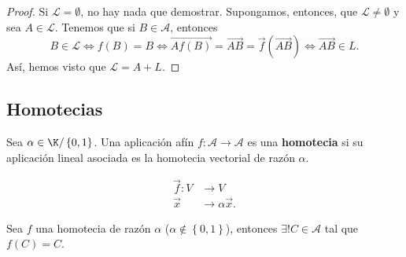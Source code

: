 \begin{proof}
Si $\displaystyle \mathcal{L} = \emptyset $, no hay nada que demostrar. Supongamos, entonces, que $\displaystyle \mathcal{L} \neq \emptyset $ y sea $\displaystyle A \in \mathcal{L} $. Tenemos que si $\displaystyle B \in \mathcal{A} $, entonces 
\[ B \in \mathcal{L} \iff f\left(B\right) = B \iff \overrightarrow{Af\left(B\right)} =\overrightarrow{AB} =\vec{f}\left(\overrightarrow{AB} \right)\iff \overrightarrow{AB} \in L.\]
Así, hemos visto que $\displaystyle \mathcal{L} = A + L $.
\end{proof}
\subsection{Homotecias}
\begin{fdefinition}[Homotecia]
	\normalfont Sea $\displaystyle \alpha \in \K / \left\{ 0,1\right\}  $. Una aplicación afín $\displaystyle f : \mathcal{A} \to \mathcal{A} $ es una \textbf{homotecia} si su aplicación lineal asociada es la homotecia vectorial de razón $\displaystyle \alpha  $. 
\end{fdefinition}
\begin{observation}
\normalfont 
\[
\begin{split}
	\vec{f} : V & \to V\\
	\vec{x} & \to \alpha \vec{x}.
\end{split}
\]
\end{observation}
\begin{ftheorem}[]
	\normalfont Sea $\displaystyle f $ una homotecia de razón $\displaystyle \alpha  $ ($\displaystyle \alpha \not\in \left\{ 0,1\right\}  $), entonces $\displaystyle \exists ! C \in \mathcal{A} $ tal que $\displaystyle f\left(C\right)= C $.
\end{ftheorem}
